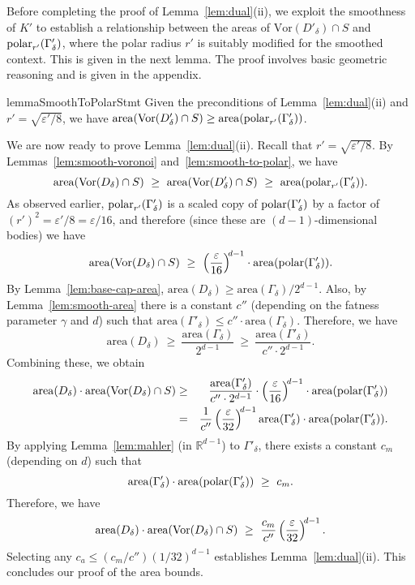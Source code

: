 \documentclass[11pt]{article}   \usepackage[letterpaper,hmargin=2.1cm,vmargin=3cm]{geometry}
\newcommand{\RE}{\mathbb{R}}    \newcommand{\ZZ}{\mathbb{Z}}    \newcommand{\eps}{\varepsilon}  \newcommand{\ST}{\,:\,}         \newcommand{\sq}{\square}
\newcommand{\inv}[1]{\frac{1}{#1}}
\newcommand{\area}{\mathrm{area}}
\newcommand{\Vor}{\mathrm{Vor}}
\begin{document}
Before completing the proof of Lemma~\ref{lem:dual}(ii), we exploit the smoothness of $K'$ to establish a relationship between the areas of $\Vor(D'_{\delta}) \cap S$ and $\mathrm{polar}_{r'}(\Gamma'_{\delta})$, where the polar radius $r'$ is suitably modified for the smoothed context. This is given in the next lemma. The proof involves basic geometric reasoning and is given in the appendix.

\begin{restatable}{lemma}{SmoothToPolarStmt}\label{lem:smooth-to-polar}
Given the preconditions of Lemma~\ref{lem:dual}(ii) and $r' = \sqrt{\eps'/8}$, we have $\area(\Vor(D'_{\delta}) \cap S) \ge \area(\polarX{r'}{\Gamma'_{\delta}})$.
\end{restatable}


\bigskip

We are now ready to prove Lemma~\ref{lem:dual}(ii). Recall that $r' = \sqrt{\eps'/8}$. By Lemmas~\ref{lem:smooth-voronoi} and~\ref{lem:smooth-to-polar}, we have
\[
	\area(\Vor(D_{\delta}) \cap S)
		~ \ge ~ \area(\Vor(D'_{\delta}) \cap S)
		~ \ge ~ \area(\polarX{r'}{\Gamma'_{\delta}}).
\]
As observed earlier, $\mathrm{polar}_{r'}(\Gamma'_{\delta})$ is a scaled copy of $\mathrm{polar}(\Gamma'_{\delta})$ by a factor of $(r')^2 = \eps'/8 = \eps/16$, and therefore (since these are $(d-1)$-dimensional bodies) we have
\[
	\area(\Vor(D_{\delta}) \cap S)
		~ \ge ~ \left(\frac{\eps}{16}\right)^{\N d-1} \cdot \area(\polar{\Gamma'_{\delta}}).
\]
By Lemma~\ref{lem:base-cap-area}, $\area(D_{\delta}) \ge \area(\Gamma_{\delta}) / 2^{d-1}$. Also, by Lemma~\ref{lem:smooth-area} there is a constant $c''$ (depending on the fatness parameter $\gamma$ and $d$) such that $\area(\Gamma'_{\delta}) \le c'' \cdot \area(\Gamma_{\delta})$. Therefore, we have
\[
	\area(D_{\delta})
		~ \ge ~ \frac{\area(\Gamma_{\delta})}{2^{d-1}}
		~ \ge ~ \frac{\area(\Gamma'_{\delta})}{c'' \cdot 2^{d-1}}.
\]
Combining these, we obtain
\begin{eqnarray*}
	\area(D_{\delta}) \cdot \area(\Vor(D_{\delta}) \cap S)
		& \ge & \frac{\area(\Gamma'_{\delta})}{c'' \cdot 2^{d-1}} \cdot \left(\frac{\eps}{16}\right)^{\N d-1} \cdot \area(\polar{\Gamma'_{\delta}}) \\
		&  =  & \inv{c''} \left( \frac{\eps}{32} \right)^{\N d-1} \area(\Gamma'_{\delta}) \cdot \area(\polar{\Gamma'_{\delta}}).
\end{eqnarray*}
By applying Lemma~\ref{lem:mahler} (in $\RE^{d-1}$) to $\Gamma'_{\delta}$, there exists a constant $c_m$ (depending on $d$) such that
\[
	\area(\Gamma'_{\delta}) \cdot \area(\polar{\Gamma'_{\delta}}) 
		~ \ge ~ c_m.
\]
Therefore, we have
\[
	\area(D_{\delta}) \cdot \area(\Vor(D_{\delta}) \cap S)
		~ \ge ~ \frac{c_m}{c''} \left( \frac{\eps}{32} \right)^{\N d-1}.
\]
Selecting any $c_a \le (c_m/c'') (1/32)^{d-1}$ establishes Lemma~\ref{lem:dual}(ii). This concludes our proof of the area bounds. 
\end{document}
